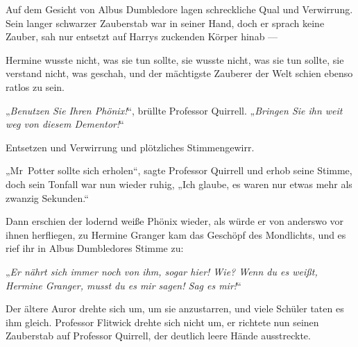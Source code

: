 Auf dem Gesicht von Albus Dumbledore lagen schreckliche Qual und Verwirrung. Sein langer schwarzer Zauberstab war in seiner Hand, doch er sprach keine Zauber, sah nur entsetzt auf Harrys zuckenden Körper hinab —

Hermine wusste nicht, was sie tun sollte, sie wusste nicht, was sie tun sollte, sie verstand nicht, was geschah, und der mächtigste Zauberer der Welt schien ebenso ratlos zu sein.

„\emph{Benutzen Sie Ihren Phönix!}“, brüllte Professor Quirrell.
„\emph{Bringen Sie ihn weit weg von diesem Dementor!}“


Entsetzen und Verwirrung und plötzliches Stimmengewirr.

„Mr~Potter sollte sich erholen“, sagte Professor Quirrell und erhob seine Stimme, doch sein Tonfall war nun wieder ruhig,
„Ich glaube, es waren nur etwas mehr als zwanzig Sekunden.“

Dann erschien der lodernd weiße Phönix wieder, als würde er von anderswo vor ihnen herfliegen, zu Hermine Granger kam das Geschöpf des Mondlichts, und es rief ihr in Albus Dumbledores Stimme zu:

„\emph{Er nährt sich immer noch von ihm, sogar hier! Wie? Wenn du es weißt, Hermine Granger, musst du es mir sagen! Sag es mir!}“

Der ältere Auror drehte sich um, um sie anzustarren, und viele Schüler taten es ihm gleich. Professor Flitwick drehte sich nicht um, er richtete nun seinen Zauberstab auf Professor Quirrell, der deutlich leere Hände ausstreckte.

